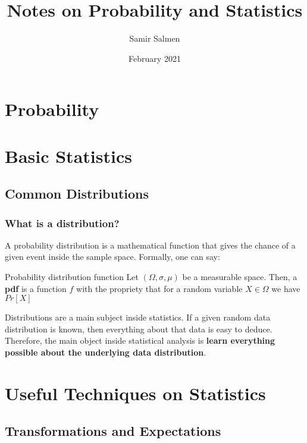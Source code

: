 \documentclass[english, a4paper,12pt]{Iart}
\theoremstyle{plain} %
\newcommand{\thistheoremname}{}
\newtheorem*{genericthm*}{\thistheoremname}
\newenvironment{namedthm*}[1]
{\renewcommand{\thistheoremname}{#1}%
	\begin{genericthm*}}
	{\end{genericthm*}}
\theoremstyle{remark}
\theoremstyle{definition}
\begin{document}
	
\author{Samir Salmen}
\title{Notes on Probability and Statistics}
\date{February 2021}

\maketitle

\part{Probability}

\part{Basic Statistics}
\chapter{Common Distributions}
\section{What is a distribution?}
A probability distribution is a mathematical function that gives the chance of a given event inside the sample space. Formally, one can say: \\ 

\begin{namedthm*}{Probability distribution function}
	Let $(\Omega, \sigma, \mu)$ be a measurable space. Then, a \textbf{pdf} is a function $f$ with the propriety that for a random variable $X \in \Omega$ we have $Pr[X]$ 
\end{namedthm*}

Distributions are a main subject inside statistics. If a given random data distribution is known, then everything about that data is easy to deduce. Therefore, the main object inside statistical analysis is \textbf{learn everything possible about the underlying data distribution}.	

















\part{Useful Techniques on Statistics}
\chapter{Transformations and Expectations}
\end{document}
